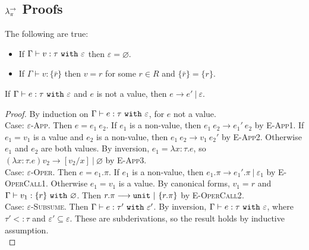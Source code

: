 \begin{appendix}

\chapter{$\lambda^{\rightarrow}_{\pi}$ Proofs}

\begin{lemma}
The following are true:
\begin{itemize}
	\setlength\itemsep{-0.7em}
	\item If $ \Gamma \vdash v: \tau~\mathtt{with}~ \varepsilon$ then $\varepsilon = \varnothing$.
	\item If $ \Gamma \vdash v: \{ \bar r \}$ then $ v = r$ for some $r \in R$ and $\{ \bar r \} = \{ r \}$.
\end{itemize}
\end{lemma}

\hrulefill


\begin{theorem}[Progress]
If $ \Gamma \vdash  e:  \tau~\mathtt{with}~ \varepsilon$ and $ e$ is not a value, then $ e \longrightarrow  e'~|~\varepsilon$.
\end{theorem}

\begin{proof} By induction on $ \Gamma \vdash  e:  \tau~\mathtt{with}~ \varepsilon$, for $ e$ not a value.\\

Case: \textsc{$\varepsilon$-App}. Then $ e =  e_1~ e_2$. If $ e_1$ is a non-value, then $ e_1~ e_2 \longrightarrow  e_1'~ e_2$ by \textsc{E-App1}. If $ e_1 =  v_1$ is a value and $ e_2$ is a non-value, then $ e_1~ e_2 \longrightarrow  v_1~ e_2'$ by \textsc{E-App2}. Otherwise $ e_1$ and $ e_2$ are both values. By inversion, $ e_1 = \lambda x:  \tau .  e$, so $(\lambda x:  \tau.  e)  v_2 \longrightarrow [ v_2/x]~|~\varnothing$ by \textsc{E-App3}.\\

Case: \textsc{$\varepsilon$-Oper}. Then $ e =  e_1.\pi$. If $ e_1$ is a non-value, then $ e_1.\pi \longrightarrow  e_1'.\pi~|~\varepsilon_1$ by \textsc{E-OperCall1}. Otherwise $ e_1 =  v_1$ is a value. By canonical forms, $ v_1 = r$ and $ \Gamma \vdash v_1: \{ r \}~\mathtt{with}~ \varnothing$. Then $r.\pi \longrightarrow \mathtt{unit}~|~\{ r.\pi \}$ by \textsc{E-OperCall2}.\\

Case: \textsc{$\varepsilon$-Subsume}. Then $ \Gamma \vdash  e:  \tau'~\mathtt{with}~ \varepsilon'$. By inversion, $ \Gamma \vdash  e: \tau~\mathtt{with}~ \varepsilon$, where $\tau' <: \tau$ and $\varepsilon' \subseteq \varepsilon$. These are subderivations, so the result holds by inductive assumption.\\
\end{proof}


\end{appendix}
